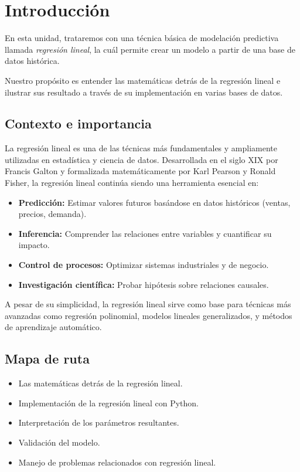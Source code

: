 \section{Introducción}

En esta unidad, trataremos con una técnica básica de modelación predictiva llamada \emph{regresión lineal}, la cuál permite crear un modelo a partir de una base de datos histórica.

Nuestro propósito es entender las matemáticas detrás de la regresión lineal e ilustrar sus resultado a través de su implementación en varias bases de datos.

\subsection{Contexto e importancia}

La regresión lineal es una de las técnicas más fundamentales y ampliamente utilizadas en estadística y ciencia de datos. Desarrollada en el siglo XIX por Francis Galton y formalizada matemáticamente por Karl Pearson y Ronald Fisher, la regresión lineal continúa siendo una herramienta esencial en:

\begin{itemize}
	\item \textbf{Predicción:} Estimar valores futuros basándose en datos históricos (ventas, precios, demanda).
	\item \textbf{Inferencia:} Comprender las relaciones entre variables y cuantificar su impacto.
	\item \textbf{Control de procesos:} Optimizar sistemas industriales y de negocio.
	\item \textbf{Investigación científica:} Probar hipótesis sobre relaciones causales.
\end{itemize}

A pesar de su simplicidad, la regresión lineal sirve como base para técnicas más avanzadas como regresión polinomial, modelos lineales generalizados, y métodos de aprendizaje automático.

\subsection{Mapa de ruta}
\begin{itemize}
	\item Las matemáticas detrás de la regresión lineal.
	\item Implementación de la regresión lineal con Python.
	\item Interpretación de los parámetros resultantes.
	\item Validación del modelo.
	\item Manejo de problemas relacionados con regresión lineal.
\end{itemize}


